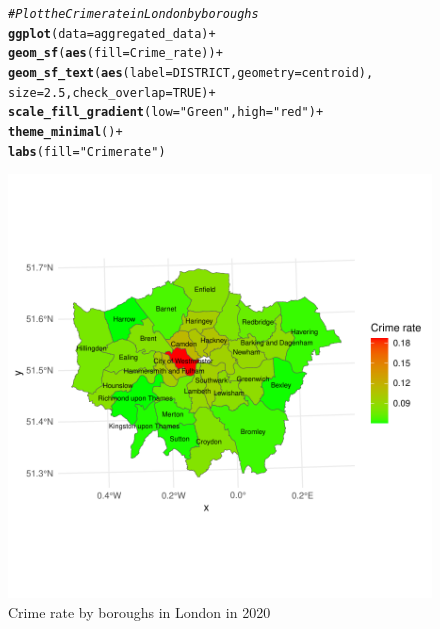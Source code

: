 \documentclass{article}\usepackage[]{graphicx}\usepackage[]{xcolor}
\makeatletter
\def\maxwidth{ %
  \ifdim\Gin@nat@width>\linewidth
    \linewidth
  \else
    \Gin@nat@width
  \fi
}
\newcommand{\hlnum}[1]{\textcolor[rgb]{0.686,0.059,0.569}{#1}}%
\newcommand{\hlstr}[1]{\textcolor[rgb]{0.192,0.494,0.8}{#1}}%
\newcommand{\hlcom}[1]{\textcolor[rgb]{0.678,0.584,0.686}{\textit{#1}}}%
\newcommand{\hlopt}[1]{\textcolor[rgb]{0,0,0}{#1}}%
\newcommand{\hlstd}[1]{\textcolor[rgb]{0.345,0.345,0.345}{#1}}%
\newcommand{\hlkwc}[1]{\textcolor[rgb]{0.333,0.667,0.333}{#1}}%
\newcommand{\hlkwd}[1]{\textcolor[rgb]{0.737,0.353,0.396}{\textbf{#1}}}%
\newenvironment{kframe}{%
 \def\at@end@of@kframe{}%
 \ifinner\ifhmode%
  \def\at@end@of@kframe{\end{minipage}}%
  \begin{minipage}{\columnwidth}%
 \fi\fi%
 \def\FrameCommand##1{\hskip\@totalleftmargin \hskip-\fboxsep
 \colorbox{shadecolor}{##1}\hskip-\fboxsep
     \hskip-\linewidth \hskip-\@totalleftmargin \hskip\columnwidth}%
 \MakeFramed {\advance\hsize-\width
   \@totalleftmargin\z@ \linewidth\hsize
   \@setminipage}}%
 {\par\unskip\endMakeFramed%
 \at@end@of@kframe}
\newenvironment{knitrout}{}{} %
\makeatother
\begin{document}
{{\begin{figure}
\begin{knitrout}
\color{fgcolor}\begin{kframe}
\begin{alltt}
\hlcom{# Plot the Crime rate in London by boroughs}
\hlkwd{ggplot}\hlstd{(}\hlkwc{data}\hlstd{=aggregated_data)} \hlopt{+}
  \hlkwd{geom_sf}\hlstd{(}\hlkwd{aes}\hlstd{(}\hlkwc{fill}\hlstd{=Crime_rate))} \hlopt{+}
  \hlkwd{geom_sf_text}\hlstd{(}\hlkwd{aes}\hlstd{(}\hlkwc{label} \hlstd{= DISTRICT,} \hlkwc{geometry} \hlstd{= centroid),}
               \hlkwc{size} \hlstd{=} \hlnum{2.5}\hlstd{,} \hlkwc{check_overlap} \hlstd{=} \hlnum{TRUE}\hlstd{)} \hlopt{+}
  \hlkwd{scale_fill_gradient}\hlstd{(}\hlkwc{low}\hlstd{=}\hlstr{"Green"}\hlstd{,} \hlkwc{high}\hlstd{=}\hlstr{"red"}\hlstd{)} \hlopt{+}
  \hlkwd{theme_minimal}\hlstd{()} \hlopt{+}
  \hlkwd{labs}\hlstd{(}\hlkwc{fill}\hlstd{=}\hlstr{"Crime rate"}\hlstd{)}
\end{alltt}
\end{kframe}
\includegraphics[width=\maxwidth]{figure/unnamed-chunk-6-1} 
\end{knitrout}
\caption{Crime rate by boroughs in London in 2020}
\label{fig:crime rate london}
\end{figure}


}}
\end{document}

